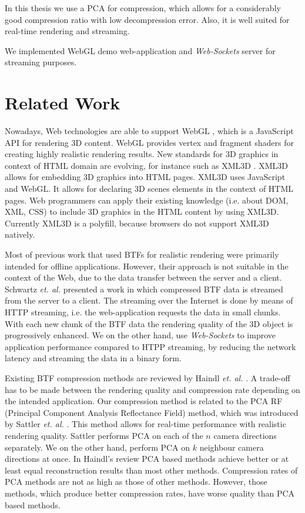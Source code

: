 In this thesis we use a PCA for compression, which allows for a considerably good compression ratio with low decompression error.
Also, it is well suited for real-time rendering and streaming.

We implemented WebGL demo web-application and \emph{Web-Sockets} server for streaming purposes.



\section{Related Work}
\label{section:related_work}

Nowadays, Web technologies are able to support WebGL \cite{webgl}, which is a JavaScript API for rendering 3D content.
WebGL provides  vertex and fragment shaders  for creating highly realistic rendering results.
New standards for 3D graphics in context of HTML domain are evolving, for instance such as XML3D \cite{xml3d}.
XML3D allows for embedding 3D graphics into HTML pages. XML3D uses JavaScript and WebGL.
It allows for declaring 3D scenes elements in the context of HTML pages.
Web programmers can apply their existing knowledge (i.e. about DOM, XML, CSS) to include 3D graphics in the HTML content by using XML3D.
Currently XML3D  is a polyfill, because browsers do not support XML3D natively.
 
Most of previous work that used BTFs for realistic rendering were primarily intended  for offline applications.
However, their approach is not suitable in the context of the Web, due to the data transfer between the server and a client.
  Schwartz \emph{et. al.} \cite{webglbtfstreaming} presented a work in which compressed BTF data is streamed from the server to a client.
 The streaming over the Internet is done by means of HTTP streaming, i.e. the web-application requests the data in small chunks.
 With each new chunk of the BTF data the rendering quality of the 3D object is progressively enhanced.
 We on the other hand, use \emph{Web-Sockets} to improve application performance compared to HTPP streaming, by reducing the network latency and streaming the data in a binary form.

 
Existing BTF compression methods are reviewed by Haindl \emph{et. al.} \cite{haindl, haindl_visual}.
A trade-off has to be made between the rendering quality and compression rate depending on the intended application.
 Our compression method is related to the PCA RF (Principal Component Analysis Reflectance Field) method, which was introduced by Sattler \emph{et. al.} \cite{star2004}.
This method allows for real-time performance with realistic rendering quality. 
Sattler performs PCA on each of the $n$ camera directions separately. We on the other hand, perform PCA on $k$ neighbour camera directions at once.
In Haindl's review \cite{haindl} PCA based methods achieve better or at least equal reconstruction results than most other methods.
Compression rates of PCA methods are not as high as those of other methods. However, those methods, which produce better compression rates, have worse quality than PCA based methods.






